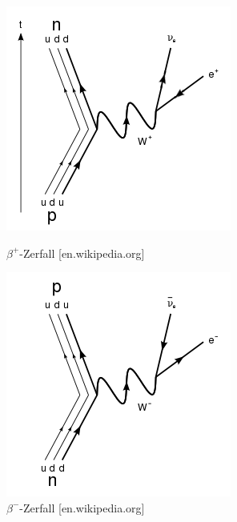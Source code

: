 \begin{figure}[H]
	\begin{minipage}{0.49\textwidth}
	\centering \includegraphics[width=\textwidth]{BilderTheorie/betaplus.png}
	\caption{$\beta^+$-Zerfall [en.wikipedia.org]}
	\end{minipage}
	\begin{minipage}{0.49\textwidth}
	\centering \includegraphics[width=\textwidth]{BilderTheorie/betaminus.png}
	\caption{$\beta^-$-Zerfall  [en.wikipedia.org]}	
	\end{minipage}
\end{figure}


